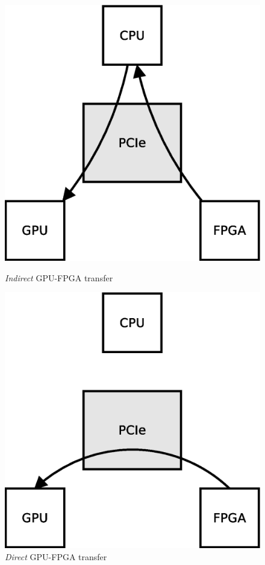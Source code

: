 \begin{center}
\begin{figure}[ht]
\hspace{1.3cm}
\begin{minipage}[b]{0.35\linewidth}
\centering
\includegraphics[width=\textwidth]{images/indirect.eps}
\caption{\emph{Indirect} GPU-FPGA transfer}
\label{fig:indirect}
\end{minipage}
\hspace{1.8cm}
\begin{minipage}[b]{0.35\linewidth}
\centering
\includegraphics[width=\textwidth]{images/direct.eps}
\caption{\emph{Direct} GPU-FPGA transfer}
\label{fig:direct}
\end{minipage}
\end{figure}
\end{center}




